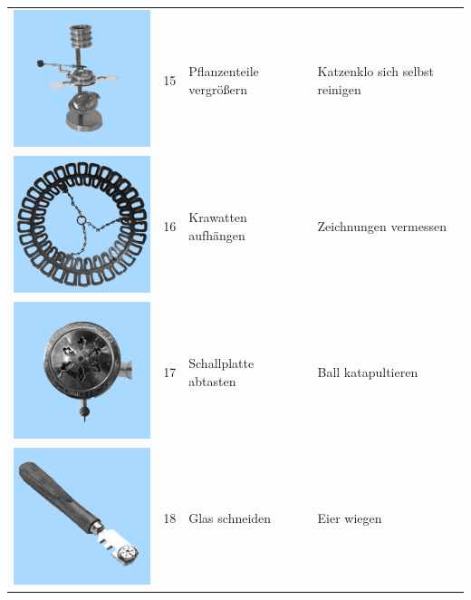 \documentclass[
  english,
  man,floatsintext]{apa7}
\begin{document}
\begin{center}
\begin{ThreePartTable}
\begin{longtable}{llll}
\includegraphics[valign=c, scale=0.19]{../materials/unfamiliar/15.png} & 15 & Pflanzenteile vergrößern & Katzenklo sich selbst reinigen\\
\includegraphics[valign=c, scale=0.19]{../materials/unfamiliar/16.png} & 16 & Krawatten aufhängen & Zeichnungen vermessen\\
\includegraphics[valign=c, scale=0.19]{../materials/unfamiliar/17.png} & 17 & Schallplatte abtasten & Ball katapultieren\\
\includegraphics[valign=c, scale=0.19]{../materials/unfamiliar/18.png} & 18 & Glas schneiden & Eier wiegen\\

\end{longtable}
\end{ThreePartTable}
\end{center}
\end{document}
